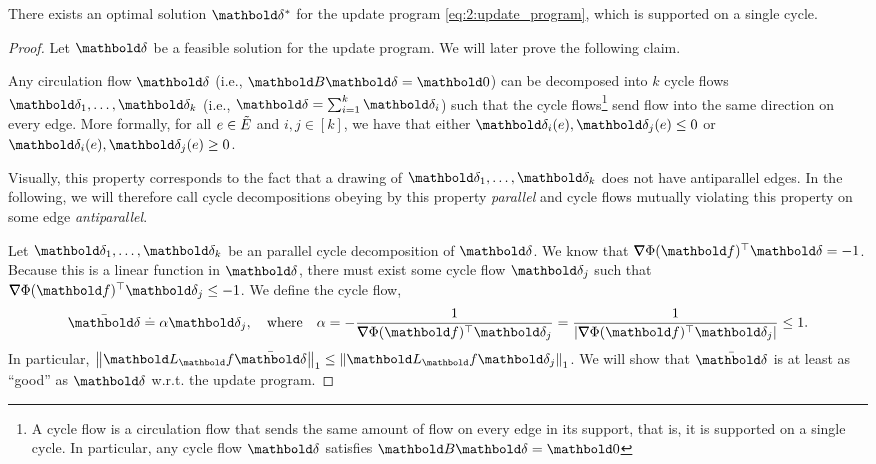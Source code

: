\documentclass{tufte-handout}
\newcommand{\Etil}{\Tilde{E}}
\newcommand{\vdeltabar}{\bar{\vdelta}}
\begin{document}
\begin{lem}
There exists an optimal solution $\s{\vdelta}$ for the update program \eqref{eq:2:update_program}, which is supported on a single cycle.
\end{lem}
\begin{proof}
Let $\vdelta$ be a feasible solution for the update program. We will later prove the following claim.

\begin{clm}\label{clm:2:C:3:1}
Any circulation flow $\vdelta$ (i.e., $\mB\vdelta = \vZero$) can be decomposed into $k$ cycle flows $\vdelta_1, \dots, \vdelta_k$ (i.e., $\vdelta = \sum_{i=1}^k \vdelta_i$) such that the cycle flows\footnote{A cycle flow is a circulation flow that sends the same amount of flow on every edge in its support, that is, it is supported on a single cycle. In particular, any cycle flow $\vdelta$ satisfies $\mB\vdelta = \vZero$} send flow into the same direction on every edge. More formally, for all $e \in \Etil$ and $i,j \in [k]$, we have that either $\vdelta_i(e),\vdelta_j(e) \leq 0$ or $\vdelta_i(e),\vdelta_j(e) \geq 0$.
\end{clm}

Visually, this property corresponds to the fact that a drawing of $\vdelta_1, \dots, \vdelta_k$ does not have antiparallel edges. In the following, we will therefore call cycle decompositions obeying by this property \emph{parallel} and cycle flows mutually violating this property on some edge \emph{antiparallel}.

Let $\vdelta_1, \dots, \vdelta_k$ be an parallel cycle decomposition of $\vdelta$. We know that $\trans{\grad\Phi(\vf)}\vdelta = -1$. Because this is a linear function in $\vdelta$, there must exist some cycle flow $\vdelta_j$ such that $\trans{\grad\Phi(\vf)}\vdelta_j \leq -1$. We define the cycle flow, \begin{align*}
    \vdeltabar \defeq \alpha\vdelta_j, \quad\text{where}\quad \alpha = -\frac{1}{\trans{\grad\Phi(\vf)}\vdelta_j} = \frac{1}{|\trans{\grad\Phi(\vf)}\vdelta_j|} \leq 1.
\end{align*} In particular, $\norm{\mL_\vf\vdeltabar}_1 \leq \norm{\mL_\vf\vdelta_j}_1$. We will show that $\vdeltabar$ is at least as ``good'' as $\vdelta$ w.r.t. the update program.


\end{proof}
\end{document}
